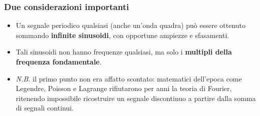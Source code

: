 \documentclass[12pt, a4paper]{article}
\begin{document}
\subsubsection{Due considerazioni importanti}
\begin{itemize}
    \item Un segnale periodico qualsiasi (anche un'onda quadra) può essere ottenuto sommando \textbf{infinite sinusoidi}, con opportune ampiezze e sfasamenti.
    \item Tali sinusoidi non hanno frequenze qualsiasi, ma solo i \textbf{multipli della frequenza fondamentale}.
    \item[] \textit{N.B.} il primo punto non era affatto scontato: matematici dell'epoca come Legendre, Poisson e Lagrange rifiutarono per anni la teoria di Fourier, ritenendo impossibile ricostruire un segnale discontinuo a partire dalla somma di segnali continui.
\end{itemize}
\end{document}
